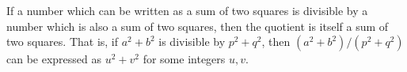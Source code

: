 If a number which can be written as a sum of two squares is divisible by a number which is also a sum of two squares, then the quotient is itself a sum of two squares. That is, if $a^2 + b^2$ is divisible by $p^2 + q^2$, then $(a^2 + b^2)/(p^2 + q^2)$ can be expressed as $u^2 + v^2$ for some integers $u, v$.
